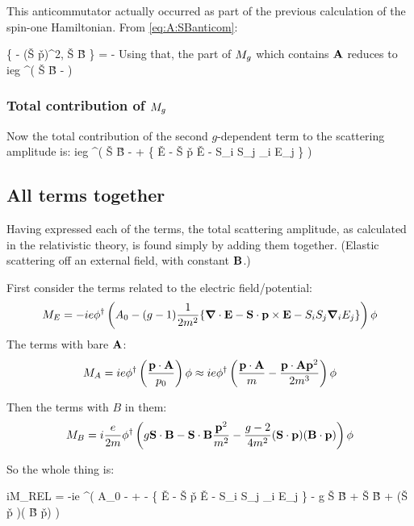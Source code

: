This anticommutator actually occurred as part of the previous calculation of the spin-one Hamiltonian.  From \eqref{eq:A:SBanticom}:

\beq
{}\left \{  - (\v{S} \cdot \v{p})^2, \v{S} \cdot \v{B} \right \} = -
\eeq
Using that, the part of $M_g$ which contains $\mathbf{A}$ reduces to 
\beq
	ieg \phi^\dagger \left( \v{S} \cdot \v{B} -   \right) \phi
\eeq

\subsubsection{Total contribution of $M_g$}
Now the total contribution of the second $g$-dependent term to the scattering amplitude is:
\beq
ieg \phi^\dagger \left ( \v{S} \cdot \v{B} -   +  \left\{ \grad \cdot \v{E} -  \v{S} \cdot \v{p} \times \v{E} - S_i S_j \grad_i E_j \right \} \right ) \phi
\eeq



\subsection{All terms together}
Having expressed each of the terms, the total scattering amplitude, as calculated in the relativistic theory, is found simply by adding them together.  (Elastic scattering off an external field, with constant $\mathbf{B}$.)

First consider the terms related to the electric field/potential:
\[ 
M_E = 	-ie\phi^\dagger \left( A_0  - (g-1)  \frac{1}{2m^2} \{ \mbox{\boldmath$ \nabla $} \cdot \mathbf{E} -  \mathbf{S} \cdot \mathbf{p} \times \mathbf{E} - S_i S_j \mbox{\boldmath$ \nabla $} _i E_j \} \right) \phi
\]
The terms with bare $\mathbf{A}$:
\[
M_A = ie\phi^\dagger \left( \frac{\mathbf{p}\cdot \mathbf{A} }{p_0}\right ) \phi 
	\approx
ie\phi^\dagger \left( \frac{\mathbf{p}\cdot \mathbf{A} }{m} - \frac{\mathbf{p}\cdot \mathbf{A} \mathbf{p}^2}{2m^3}\right ) \phi 
\]

Then the terms with $B$ in them:
\[
M_B = 	i\frac{e}{2m}\phi^\dagger \left(  
		g \mathbf{S} \cdot \mathbf{B} -  \mathbf{S} \cdot \mathbf{B} \frac{\mathbf{p}^2}{m^2}
		-\frac{g-2}{4m^2}(\mathbf{S} \cdot \mathbf{p} )( \mathbf{B} \cdot \mathbf{p})
	\right ) \phi
\]

So the whole thing is:

\beq \label{eq:S1:MRel}
iM_{REL} = -ie \phi^\dagger \Big (
		 A_0  -  + 
		- \{ \grad \cdot \v{E} -  \v{S} \cdot \v{p} \times \v{E} - S_i S_j \grad_i E_j \}
		- g \v{S} \cdot \v{B}
		+ \v{S} \cdot \v{B} 
		+ (\v{S} \cdot \v{p} )( \v{B} \cdot \v{p})
	\Big ) \phi
\eeq



